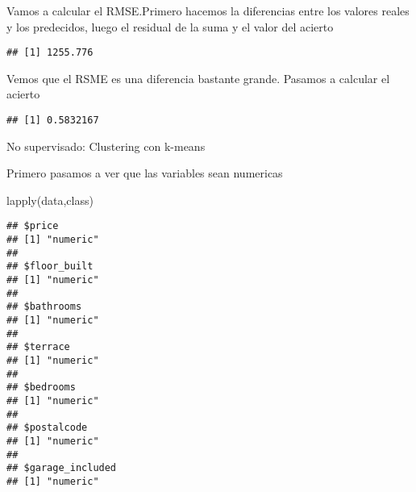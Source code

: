 \documentclass[
]{article}
\newenvironment{Shaded}{\begin{snugshade}}{\end{snugshade}}
\newcommand{\DecValTok}[1]{\textcolor[rgb]{0.00,0.00,0.81}{#1}}
\newcommand{\FunctionTok}[1]{\textcolor[rgb]{0.00,0.00,0.00}{#1}}
\newcommand{\NormalTok}[1]{#1}
\newcommand{\OtherTok}[1]{\textcolor[rgb]{0.56,0.35,0.01}{#1}}
\newcommand{\SpecialCharTok}[1]{\textcolor[rgb]{0.00,0.00,0.00}{#1}}
\begin{document}
Vamos a calcular el RMSE.Primero hacemos la diferencias entre los
valores reales y los predecidos, luego el residual de la suma y el valor
del acierto

\begin{Shaded}
\end{Shaded}

\begin{verbatim}
## [1] 1255.776
\end{verbatim}

Vemos que el RSME es una diferencia bastante grande. Pasamos a calcular
el acierto

\begin{Shaded}
\end{Shaded}

\begin{verbatim}
## [1] 0.5832167
\end{verbatim}

No supervisado: Clustering con k-means

Primero pasamos a ver que las variables sean numericas

\begin{Shaded}
\begin{Highlighting}[]
\FunctionTok{lapply}\NormalTok{(data,class)}
\end{Highlighting}
\end{Shaded}

\begin{verbatim}
## $price
## [1] "numeric"
## 
## $floor_built
## [1] "numeric"
## 
## $bathrooms
## [1] "numeric"
## 
## $terrace
## [1] "numeric"
## 
## $bedrooms
## [1] "numeric"
## 
## $postalcode
## [1] "numeric"
## 
## $garage_included
## [1] "numeric"
\end{verbatim}
\end{document}

